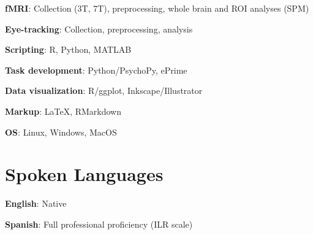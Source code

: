 \documentclass{article}
\newcommand{\skillentry}[2]{
  {\hspace{2em}\textbf{#1}:}
  {#2}
  \vspace{.25cm}
}
\begin{document}
\skillentry{fMRI}
{Collection (3T, 7T), preprocessing, whole brain and ROI analyses (SPM)}

\skillentry{Eye-tracking}{Collection, preprocessing, analysis}

\skillentry{Scripting}{R, Python, MATLAB}

\skillentry{Task development}
{Python/PsychoPy, ePrime}

\skillentry{Data visualization}{R/ggplot, Inkscape/Illustrator}

\skillentry{Markup}{\LaTeX, RMarkdown}

\skillentry{OS}{Linux, Windows, MacOS}

\section{Spoken Languages}
\skillentry{English}{Native}

\skillentry{Spanish}{Full professional proficiency (ILR scale)}
\end{document}
